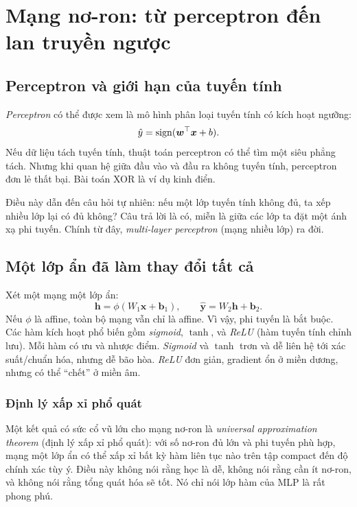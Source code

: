 \chapter{Mạng nơ-ron: từ perceptron đến lan truyền ngược}

\section{Perceptron và giới hạn của tuyến tính}

\emph{Perceptron} có thể được xem là mô hình phân loại tuyến tính có kích hoạt ngưỡng:
\[
\hat{y} = \mathrm{sign}(\bm{w}^\top \bm{x}+b).
\]
Nếu dữ liệu tách tuyến tính, thuật toán perceptron có thể tìm một siêu phẳng tách. Nhưng khi quan hệ giữa đầu vào và đầu ra không tuyến tính, perceptron đơn lẻ thất bại. Bài toán XOR là ví dụ kinh điển.

Điều này dẫn đến câu hỏi tự nhiên: nếu một lớp tuyến tính không đủ, ta xếp nhiều lớp lại có đủ không? Câu trả lời là có, miễn là giữa các lớp ta đặt một ánh xạ phi tuyến. Chính từ đây, \emph{multi-layer perceptron} (mạng nhiều lớp) ra đời.

\section{Một lớp ẩn đã làm thay đổi tất cả}

Xét một mạng một lớp ẩn:
\[
\bm{h} = \phi(W_1\bm{x}+\bm{b}_1),\qquad
\hat{\bm{y}} = W_2\bm{h}+\bm{b}_2.
\]
Nếu \(\phi\) là affine, toàn bộ mạng vẫn chỉ là affine. Vì vậy, phi tuyến là bắt buộc. Các hàm kích hoạt phổ biến gồm \emph{sigmoid}, \(\tanh\), và \emph{ReLU} (hàm tuyến tính chỉnh lưu). Mỗi hàm có ưu và nhược điểm. \emph{Sigmoid} và \(\tanh\) trơn và dễ liên hệ tới xác suất/chuẩn hóa, nhưng dễ bão hòa. \emph{ReLU} đơn giản, gradient ổn ở miền dương, nhưng có thể ``chết'' ở miền âm.

\subsection{Định lý xấp xỉ phổ quát}

Một kết quả có sức cổ vũ lớn cho mạng nơ-ron là \emph{universal approximation theorem} (định lý xấp xỉ phổ quát): với số nơ-ron đủ lớn và phi tuyến phù hợp, mạng một lớp ẩn có thể xấp xỉ bất kỳ hàm liên tục nào trên tập compact đến độ chính xác tùy ý. Điều này không nói rằng học là dễ, không nói rằng cần ít nơ-ron, và không nói rằng tổng quát hóa sẽ tốt. Nó chỉ nói lớp hàm của MLP là rất phong phú.


